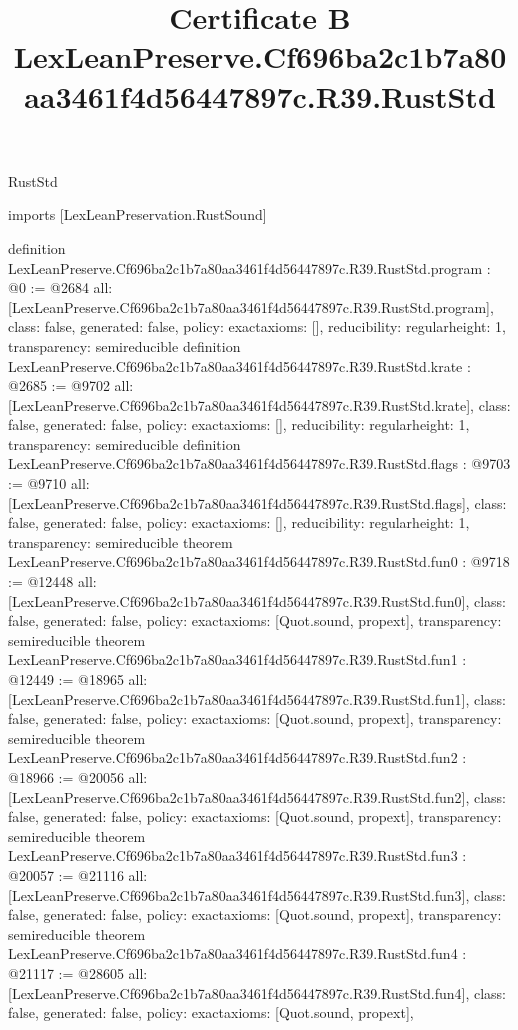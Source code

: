 \begin{lexlean}{RustStd}
\title{Certificate B LexLeanPreserve.Cf696ba2c1b7a80aa3461f4d56447897c.R39.RustStd}
\begin{coremodule}
imports [LexLeanPreservation.RustSound]

definition LexLeanPreserve.Cf696ba2c1b7a80aa3461f4d56447897c.R39.RustStd.program : @0 := @2684 {
  all: [LexLeanPreserve.Cf696ba2c1b7a80aa3461f4d56447897c.R39.RustStd.program],
  class: false,
  generated: false,
  policy: exact{axioms: []},
  reducibility: regular{height: 1},
  transparency: semireducible
}
definition LexLeanPreserve.Cf696ba2c1b7a80aa3461f4d56447897c.R39.RustStd.krate : @2685 := @9702 {
  all: [LexLeanPreserve.Cf696ba2c1b7a80aa3461f4d56447897c.R39.RustStd.krate],
  class: false,
  generated: false,
  policy: exact{axioms: []},
  reducibility: regular{height: 1},
  transparency: semireducible
}
definition LexLeanPreserve.Cf696ba2c1b7a80aa3461f4d56447897c.R39.RustStd.flags : @9703 := @9710 {
  all: [LexLeanPreserve.Cf696ba2c1b7a80aa3461f4d56447897c.R39.RustStd.flags],
  class: false,
  generated: false,
  policy: exact{axioms: []},
  reducibility: regular{height: 1},
  transparency: semireducible
}
theorem LexLeanPreserve.Cf696ba2c1b7a80aa3461f4d56447897c.R39.RustStd.fun0 : @9718 := @12448 {
  all: [LexLeanPreserve.Cf696ba2c1b7a80aa3461f4d56447897c.R39.RustStd.fun0],
  class: false,
  generated: false,
  policy: exact{axioms: [Quot.sound, propext]},
  transparency: semireducible
}
theorem LexLeanPreserve.Cf696ba2c1b7a80aa3461f4d56447897c.R39.RustStd.fun1 : @12449 := @18965 {
  all: [LexLeanPreserve.Cf696ba2c1b7a80aa3461f4d56447897c.R39.RustStd.fun1],
  class: false,
  generated: false,
  policy: exact{axioms: [Quot.sound, propext]},
  transparency: semireducible
}
theorem LexLeanPreserve.Cf696ba2c1b7a80aa3461f4d56447897c.R39.RustStd.fun2 : @18966 := @20056 {
  all: [LexLeanPreserve.Cf696ba2c1b7a80aa3461f4d56447897c.R39.RustStd.fun2],
  class: false,
  generated: false,
  policy: exact{axioms: [Quot.sound, propext]},
  transparency: semireducible
}
theorem LexLeanPreserve.Cf696ba2c1b7a80aa3461f4d56447897c.R39.RustStd.fun3 : @20057 := @21116 {
  all: [LexLeanPreserve.Cf696ba2c1b7a80aa3461f4d56447897c.R39.RustStd.fun3],
  class: false,
  generated: false,
  policy: exact{axioms: [Quot.sound, propext]},
  transparency: semireducible
}
theorem LexLeanPreserve.Cf696ba2c1b7a80aa3461f4d56447897c.R39.RustStd.fun4 : @21117 := @28605 {
  all: [LexLeanPreserve.Cf696ba2c1b7a80aa3461f4d56447897c.R39.RustStd.fun4],
  class: false,
  generated: false,
  policy: exact{axioms: [Quot.sound, propext]},
}
\end{coremodule}
\end{lexlean}
